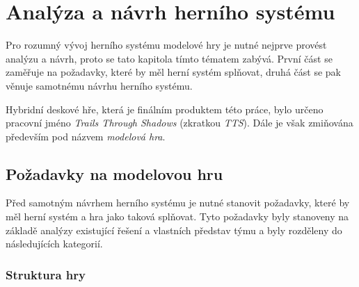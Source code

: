 \chapter{Analýza a návrh herního systému}
\label{chap:design_analysis}

Pro rozumný vývoj herního systému modelové hry je nutné nejprve provést analýzu a návrh, proto se tato kapitola tímto tématem zabývá. První část se zaměřuje na požadavky, které by měl herní systém splňovat, druhá část se pak věnuje samotnému návrhu herního systému.

Hybridní deskové hře, která je finálním produktem této práce, bylo určeno pracovní jméno \textit{Trails Through Shadows} (zkratkou \textit{TTS}). Dále je však zmiňována především pod názvem \textit{modelová hra}.

\section{Požadavky na modelovou hru}
\label{sec:requirements}

Před samotným návrhem herního systému je nutné stanovit požadavky, které by měl herní systém a hra jako taková splňovat. Tyto požadavky byly stanoveny na základě analýzy existující řešení  a vlastních představ týmu a byly rozděleny do následujících kategorií.

\subsection*{Struktura hry}
\label{subsec:req_structure}


